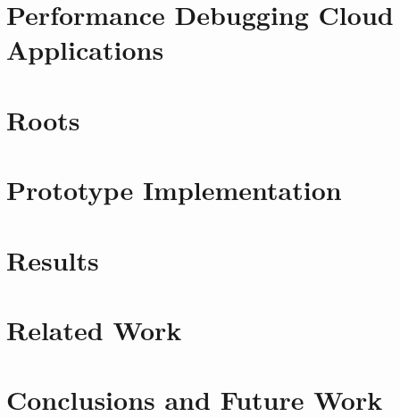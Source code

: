 

\section{Performance Debugging Cloud Applications}
\label{sec:roots_background}


\section{Roots}
\label{sec:roots_arch}


\section{Prototype Implementation}
\label{sec:roots_impl}


\section{Results}
\label{sec:roots_results}


\section{Related Work}


\section{Conclusions and Future Work}
